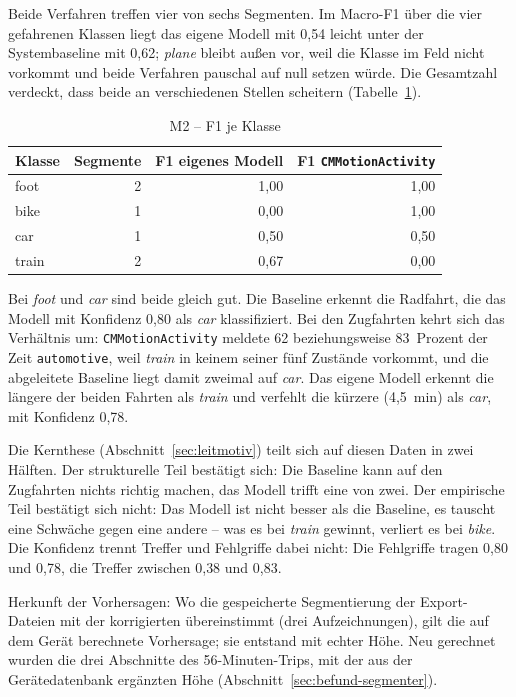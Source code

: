 \documentclass[11pt,a4paper,oneside]{article}
\begin{document}
Beide Verfahren treffen vier von sechs Segmenten. Im Macro-F1 über die vier
gefahrenen Klassen liegt das eigene Modell mit 0{,}54 leicht unter der
Systembaseline mit 0{,}62; \emph{plane} bleibt außen vor, weil die Klasse im
Feld nicht vorkommt und beide Verfahren pauschal auf null setzen würde.
Die Gesamtzahl verdeckt, dass beide an verschiedenen Stellen scheitern
(Tabelle~\ref{tab:m2-klasse}).

\begin{table}[htbp]
\centering
\small
\caption{M2 -- F1 je Klasse}
\label{tab:m2-klasse}
\begin{tabularx}{\linewidth}{@{}lrrr@{}}
\toprule
\textbf{Klasse} & \textbf{Segmente} & \textbf{F1 eigenes Modell} &
\textbf{F1 \texttt{CMMotionActivity}} \\
\midrule
foot  & 2 & 1{,}00 & 1{,}00 \\
bike  & 1 & 0{,}00 & 1{,}00 \\
car   & 1 & 0{,}50 & 0{,}50 \\
train & 2 & 0{,}67 & 0{,}00 \\
\bottomrule
\end{tabularx}
\end{table}

Bei \emph{foot} und \emph{car} sind beide gleich gut. Die Baseline erkennt
die Radfahrt, die das Modell mit Konfidenz 0{,}80 als \emph{car}
klassifiziert. Bei den Zugfahrten kehrt sich das Verhältnis um:
\texttt{CMMotionActivity} meldete 62 beziehungsweise 83~Prozent der Zeit
\texttt{automotive}, weil \emph{train} in keinem seiner fünf Zustände
vorkommt, und die abgeleitete Baseline liegt damit zweimal auf \emph{car}.
Das eigene Modell erkennt die längere der beiden Fahrten als \emph{train}
und verfehlt die kürzere (4{,}5~min) als \emph{car}, mit Konfidenz 0{,}78.

Die Kernthese (Abschnitt~\ref{sec:leitmotiv}) teilt sich auf diesen Daten
in zwei Hälften. Der strukturelle Teil bestätigt sich: Die Baseline kann
auf den Zugfahrten nichts richtig machen, das Modell trifft eine von
zwei. Der empirische Teil bestätigt sich nicht: Das Modell ist nicht
besser als die Baseline, es tauscht eine Schwäche gegen eine andere --
was es bei \emph{train} gewinnt, verliert es bei \emph{bike}. Die
Konfidenz trennt Treffer und Fehlgriffe dabei nicht: Die Fehlgriffe tragen
0{,}80 und 0{,}78, die Treffer zwischen 0{,}38 und 0{,}83.

Herkunft der Vorhersagen: Wo die gespeicherte Segmentierung der Export-
Dateien mit der korrigierten übereinstimmt (drei Aufzeichnungen), gilt die
auf dem Gerät berechnete Vorhersage; sie entstand mit echter Höhe. Neu
gerechnet wurden die drei Abschnitte des 56-Minuten-Trips, mit der aus der
Gerätedatenbank ergänzten Höhe (Abschnitt~\ref{sec:befund-segmenter}).
\end{document}

